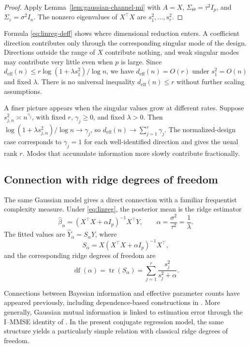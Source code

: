 \documentclass[11pt]{article}
\theoremstyle{plain}
\theoremstyle{definition}
\theoremstyle{remark}
\begin{document}
\begin{proof}
	Apply Lemma~\ref{lem:gaussian-channel-mi} with \(A=X\), \(\Sigma_\Theta=\tau^2I_p\), and \(\Sigma_\varepsilon=\sigma^2I_n\). The nonzero eigenvalues of \(X^\top X\) are \(s_1^2,\ldots,s_r^2\).
\end{proof}

Formula \eqref{eq:linreg-deff} shows where dimensional reduction enters. A coefficient direction contributes only through the corresponding singular mode of the design. Directions outside the range of \(X\) contribute nothing, and weak singular modes may contribute very little even when \(p\) is large. Since \(d_{\mathrm{eff}}(n)\le r\log(1+\lambda s_1^2)/\log n\), we have \(d_{\mathrm{eff}}(n)=O(r)\) under \(s_1^2=O(n)\) and fixed \(\lambda\). There is no universal inequality \(d_{\mathrm{eff}}(n)\le r\) without further scaling assumptions.

A finer picture appears when the singular values grow at different rates. Suppose \(s_{j,n}^2\asymp n^{\gamma_j}\), with fixed \(r\), \(\gamma_j\ge0\), and fixed \(\lambda>0\). Then \(\log(1+\lambda s_{j,n}^2)/\log n\to\gamma_j\), so
\(
	d_{\mathrm{eff}}(n)\longrightarrow\sum_{j=1}^r\gamma_j.
\)
The normalized-design case corresponds to \(\gamma_j=1\) for each well-identified direction and gives the usual rank \(r\). Modes that accumulate information more slowly contribute fractionally.


\subsection{Connection with ridge degrees of freedom}
\label{subsec:df}

The same Gaussian model gives a direct connection with a familiar frequentist complexity measure. Under \eqref{eq:linreg}, the posterior mean is the ridge estimator
\[
\hat\beta_\alpha=(X^\top X+\alpha I_p)^{-1}X^\top Y,
\qquad
\alpha=\frac{\sigma^2}{\tau^2}=\frac{1}{\lambda}.
\]
The fitted values are \(\hat Y_\alpha=S_\alpha Y\), where
\[
S_\alpha=X(X^\top X+\alpha I_p)^{-1}X^\top,
\]
and the corresponding ridge degrees of freedom are
\[
\operatorname{df}(\alpha)
=
\operatorname{tr}(S_\alpha)
=
\sum_{j=1}^r \frac{s_j^2}{s_j^2+\alpha}.
\]

Connections between Bayesian information and effective parameter counts have appeared previously, including dependence-based constructions in \citet{van2012bayesian}. More generally, Gaussian mutual information is linked to estimation error through the I--MMSE identity of \citet{guo2005mutual}. In the present conjugate regression model, the same structure yields a particularly simple relation with classical ridge degrees of freedom.
\end{document}
